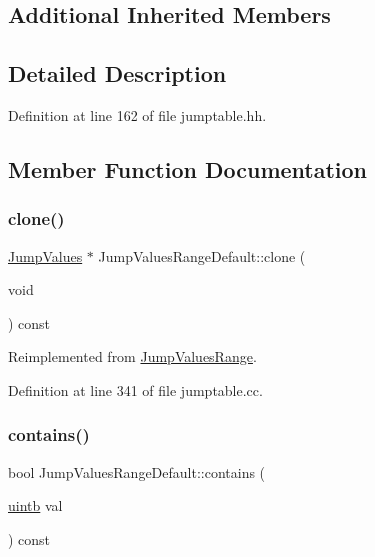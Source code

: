 \subsection*{Additional Inherited Members}


\subsection{Detailed Description}


Definition at line 162 of file jumptable.\+hh.



\subsection{Member Function Documentation}
\mbox{\label{class_jump_values_range_default_ac0169c2a1146293eac5fc316411398ba}} 
\subsubsection{\texorpdfstring{clone()}{clone()}}
{\footnotesize\ttfamily \mbox{\hyperlink{class_jump_values}{Jump\+Values}} $\ast$ Jump\+Values\+Range\+Default\+::clone (\begin{DoxyParamCaption}\item[{void}]{ }\end{DoxyParamCaption}) const\hspace{0.3cm}{\ttfamily [virtual]}}



Reimplemented from \mbox{\hyperlink{class_jump_values_range_a1e22013b45547017b47758fd8901b0ef}{Jump\+Values\+Range}}.



Definition at line 341 of file jumptable.\+cc.

\mbox{\label{class_jump_values_range_default_a6f7f9429f60a706f419d4c834fdf4943}} 
\subsubsection{\texorpdfstring{contains()}{contains()}}
{\footnotesize\ttfamily bool Jump\+Values\+Range\+Default\+::contains (\begin{DoxyParamCaption}\item[{\mbox{\hyperlink{types_8h_a2db313c5d32a12b01d26ac9b3bca178f}{uintb}}}]{val }\end{DoxyParamCaption}) const\hspace{0.3cm}{\ttfamily [virtual]}}



